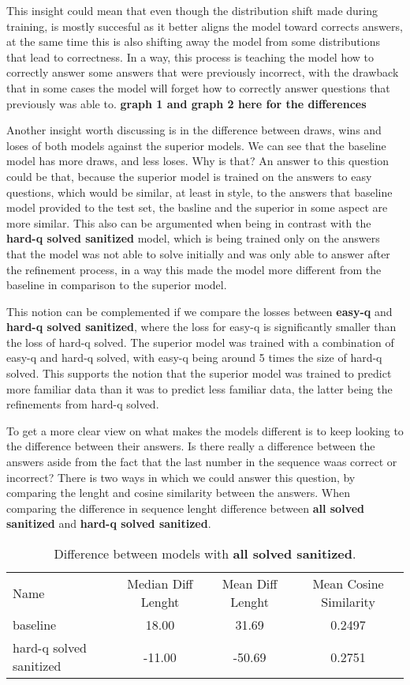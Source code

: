 \documentclass[a4paper,10pt]{article}
\begin{document}
This insight could mean that even though the distribution shift made during training, is mostly succesful as it better aligns the model toward corrects answers, at the same time this is also shifting away the model from some distributions that lead to correctness. In a way, this process is teaching the model how to correctly answer some answers that were previously incorrect, with the drawback that in some cases the model will forget how to correctly answer questions that previously was able to. 
\textbf{graph 1 and graph 2 here for the differences}

Another insight worth discussing is in the difference between draws, wins and loses of both models against the superior models. We can see that the baseline model has more draws, and less loses. Why is that? An answer to this question could be that, because the superior model is trained on the answers to easy questions, which would be similar, at least in style, to the answers that baseline model provided to the test set, the basline and the superior in some aspect are more similar. This also can be argumented when being in contrast with the \textbf{hard-q solved sanitized} model, which is being trained only on the answers that the model was not able to solve initially and was only able to answer after the refinement process, in a way this made the model more different from the baseline in comparison to the superior model.

This notion can be complemented if we compare the losses between \textbf{easy-q} and \textbf{hard-q solved sanitized}, where the loss for easy-q is significantly smaller than the loss of hard-q solved. The superior model was trained with a combination of easy-q and hard-q solved, with easy-q being around 5 times the size of hard-q solved. This supports the notion that the superior model was trained to predict more familiar data than it was to predict less familiar data, the latter being the refinements from hard-q solved.

To get a more clear view on what makes the models different is to keep looking to the difference between their answers.  Is there really a difference between the answers aside from the fact that the last number in the sequence waas correct or incorrect? There is two ways in which we could answer this question, by comparing the lenght and cosine similarity between the answers. When comparing the difference in sequence lenght difference between \textbf{all solved sanitized} and \textbf{hard-q solved sanitized}.

\begin{table}[ht]
\centering
 \begin{tabular}{lccc}
 Name  & Median Diff Lenght & Mean Diff Lenght & Mean Cosine Similarity \\
 baseline & 18.00 & 31.69  & 0.2497 \\
 hard-q solved sanitized & -11.00 & -50.69 & 0.2751 \\
 \end{tabular}
 \caption{Difference between models with \textbf{all solved sanitized}. }
\end{table}
\end{document}
